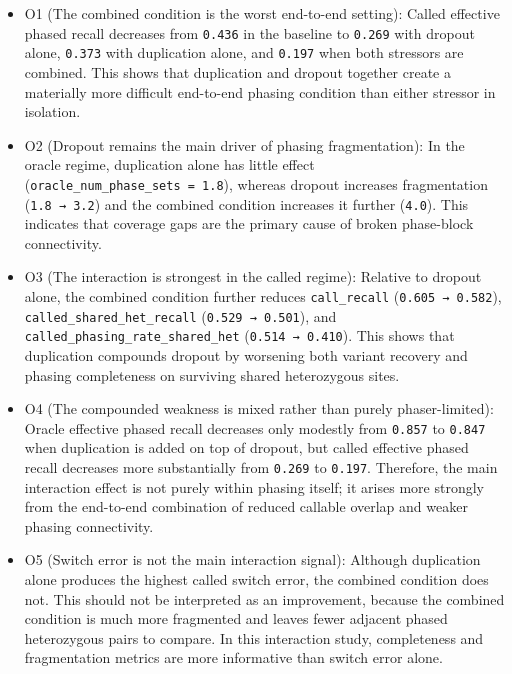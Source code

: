 \documentclass[
]{article}
\begin{document}
\begin{itemize}
\item
  O1 (The combined condition is the worst end-to-end setting): Called
  effective phased recall decreases from \texttt{0.436} in the baseline
  to \texttt{0.269} with dropout alone, \texttt{0.373} with duplication
  alone, and \texttt{0.197} when both stressors are combined. This shows
  that duplication and dropout together create a materially more
  difficult end-to-end phasing condition than either stressor in
  isolation.
\item
  O2 (Dropout remains the main driver of phasing fragmentation): In the
  oracle regime, duplication alone has little effect
  (\texttt{oracle\_num\_phase\_sets\ =\ 1.8}), whereas dropout increases
  fragmentation (\texttt{1.8\ →\ 3.2}) and the combined condition
  increases it further (\texttt{4.0}). This indicates that coverage gaps
  are the primary cause of broken phase-block connectivity.
\item
  O3 (The interaction is strongest in the called regime): Relative to
  dropout alone, the combined condition further reduces
  \texttt{call\_recall} (\texttt{0.605\ →\ 0.582}),
  \texttt{called\_shared\_het\_recall} (\texttt{0.529\ →\ 0.501}), and
  \texttt{called\_phasing\_rate\_shared\_het}
  (\texttt{0.514\ →\ 0.410}). This shows that duplication compounds
  dropout by worsening both variant recovery and phasing completeness on
  surviving shared heterozygous sites.
\item
  O4 (The compounded weakness is mixed rather than purely
  phaser-limited): Oracle effective phased recall decreases only
  modestly from \texttt{0.857} to \texttt{0.847} when duplication is
  added on top of dropout, but called effective phased recall decreases
  more substantially from \texttt{0.269} to \texttt{0.197}. Therefore,
  the main interaction effect is not purely within phasing itself; it
  arises more strongly from the end-to-end combination of reduced
  callable overlap and weaker phasing connectivity.
\item
  O5 (Switch error is not the main interaction signal): Although
  duplication alone produces the highest called switch error, the
  combined condition does not. This should not be interpreted as an
  improvement, because the combined condition is much more fragmented
  and leaves fewer adjacent phased heterozygous pairs to compare. In
  this interaction study, completeness and fragmentation metrics are
  more informative than switch error alone.
\end{itemize}
\end{document}
